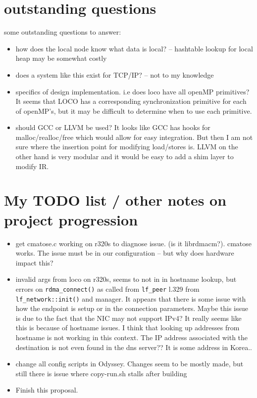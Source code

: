 \documentclass[sigplan,nonacm]{acmart}
\begin{document}
\section{outstanding questions}
some outstanding questions to answer:
\begin{itemize}
    \item how does the local node know what data is local? -- hashtable lookup for local heap 
    may be somewhat costly
    \item does a system like this exist for TCP/IP? -- not to my knowledge
    \item specifics of design implementation. i.e does loco have all openMP primitives? It 
    seems that LOCO has a corresponding synchronization primitive for each of openMP's, but it 
    may be difficult to determine when to use each primitive.
    \item should GCC or LLVM be used? It looks like GCC has hooks for malloc/realloc/free which 
    would allow for easy integration. But then I am not sure where the insertion point for modifying 
    load/stores is. LLVM on the other hand is very modular and it would be easy to add a shim layer 
    to modify IR. 
\end{itemize}

\section{My TODO list / other notes on project progression}
\begin{itemize}
    \item get cmatose.c working on r320s to diagnose issue. (is it librdmacm?). cmatose
    works. The issue must be in our configuration -- but why does hardware impact this?
    \item invalid args from loco on r320s, seems to not in in hostname lookup, but errors 
    on \texttt{rdma\_connect()} as called from \texttt{lf\_peer} l.329 from \texttt{lf\_network::init()} and manager.
    It appears that there is some issue with how the endpoint is setup or in the connection 
    parameters. Maybe this issue is due to the fact that the NIC may not support IPv4? 
    It really seems like this is because of hostname issues. I think that looking up addresses
    from hostname is not working in this context. The IP address associated with the destination 
    is not even found in the dns server?? It is some address in Korea..
    \item change all config scripts in Odyssey. Changes seem to be mostly made, but 
    still there is issue where copy-run.sh stalls after building
    \item Finish this proposal.
\end{itemize}


% 
% 
\end{document}
